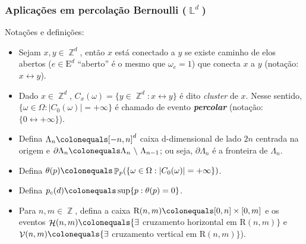 \documentclass[9pt]{beamer}
\theoremstyle{definition} %
\DeclareMathOperator{\PX}{\mathbb{P}} %
\DeclareMathOperator{\ZX}{\mathbb{Z}} %
\DeclareMathOperator{\LX}{\mathbb{L}} %
\DeclareMathOperator{\HC}{\mathcal{H}} %
\DeclareMathOperator{\VC}{\mathcal{V}} %
\newenvironment{myitemize}
{ \begin{itemize}
	\setlength{\itemsep}{6pt}
	\setlength{\parskip}{0pt}
	\setlength{\parsep}{0pt} }
{ \end{itemize} }
\begin{document}
	\begin{frame}[t]
		\frametitle{Aplicações em percolação Bernoulli ($\LX^d$)}
		Notações e definições:
		\begin{myitemize}
			\item Sejam $x, y \in \ZX^d$, então $x$ está conectado a $y$ se existe caminho de elos abertos ($e \in \text{E}^d$ ``aberto'' é o mesmo que $\omega_e = 1$) que conecta $x$ a $y$ (notação: $x \leftrightarrow y$).
			\pause
			
			\item Dado $x \in \ZX^d$, $C_x(\omega) = \{y \in \ZX^d : x \leftrightarrow y\}$ é dito \textit{cluster} de $x$. Nesse sentido, $\{\omega \in \Omega : |C_0(\omega)| = +\infty\}$ é chamado de evento \textit{\textbf{percolar}} (notação: $\{0 \leftrightarrow +\infty\}$).
			\pause
			
			\item Defina $\Lambda_n \colonequals [-n, n]^d$ caixa d-dimensional de lado $2n$ centrada na origem e $\partial\Lambda_n \colonequals \Lambda_n \text{~\textbackslash~} \Lambda_{n - 1}$; ou seja, $\partial\Lambda_n$ é a fronteira de $\Lambda_n$.
			\pause
			
			\item Defina $\theta(p) \colonequals \PX_p(\{\omega \in \Omega : |C_0(\omega)| = +\infty\})$.
			\pause
			
			\item Defina $p_c(d) \colonequals \sup\{p:\theta(p) = 0\}$.
			\pause
			
			\item Para $n, m \in \ZX$, defina a caixa $\text{R}(n, m) \colonequals [0, n] \times [0, m]$ e os eventos $\HC(n, m) \colonequals \{\exists$ cruzamento horizontal em $\text{R}(n, m)\}$ e $\VC(n, m) \colonequals \{\exists$ cruzamento vertical em $\text{R}(n, m)\}$).
		\end{myitemize}
	\end{frame}
\end{document}
